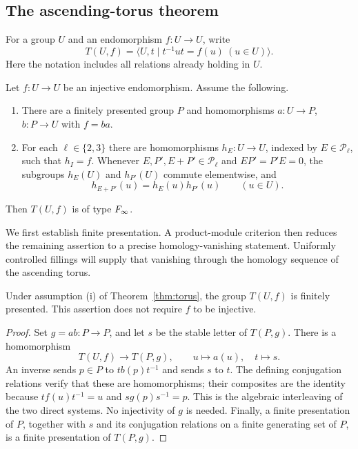\subsection{The ascending-torus theorem}

For a group $U$ and an endomorphism $f:U\to U$, write
\[
 T(U,f)=\langle U,t\mid t^{-1}ut=f(u)\ (u\in U)\rangle.
\]
Here the notation includes all relations already holding in $U$.

\begin{theorem}\label{thm:torus}
Let $f:U\to U$ be an injective endomorphism.  Assume the following.
\begin{enumerate}[label=\textup{(\roman*)}]
\item There are a finitely presented group $P$ and homomorphisms
      $a:U\to P$, $b:P\to U$ with $f=ba$.
\item For each $\ell\in\{2,3\}$ there are homomorphisms
      $h_E:U\to U$, indexed by $E\in\mathcal P_\ell$, such that
      $h_I=f$.  Whenever $E,P',E+P'\in\mathcal P_\ell$ and
      $EP'=P'E=0$, the subgroups $h_E(U)$ and $h_{P'}(U)$ commute
      elementwise, and
      \[
       h_{E+P'}(u)=h_E(u)h_{P'}(u)\qquad(u\in U).
      \]
\end{enumerate}
Then $T(U,f)$ is of type $F_\infty$.
\end{theorem}

We first establish finite presentation.  A product-module criterion
then reduces the remaining assertion to a precise homology-vanishing
statement.  Uniformly controlled fillings will supply that vanishing
through the homology sequence of the ascending torus.

\begin{lemma}\label{lem:torus-presentation}
Under assumption \textup{(i)} of Theorem~\ref{thm:torus}, the group
$T(U,f)$ is finitely presented.  This assertion does not require $f$
to be injective.
\end{lemma}

\begin{proof}
Set $g=ab:P\to P$, and let $s$ be the stable letter of $T(P,g)$.
There is a homomorphism
\[
 T(U,f)\longrightarrow T(P,g),\qquad u\longmapsto a(u),\quad
 t\longmapsto s.
\]
An inverse sends $p\in P$ to $t b(p)t^{-1}$ and sends $s$ to $t$.
The defining conjugation relations verify that these are homomorphisms;
their composites are the identity because
$t f(u)t^{-1}=u$ and $s g(p)s^{-1}=p$.
This is the algebraic interleaving of the two direct systems.  No
injectivity of $g$ is needed.  Finally, a finite presentation of $P$,
together with $s$ and its conjugation relations on a finite generating
set of $P$, is a finite presentation of $T(P,g)$.
\end{proof}

